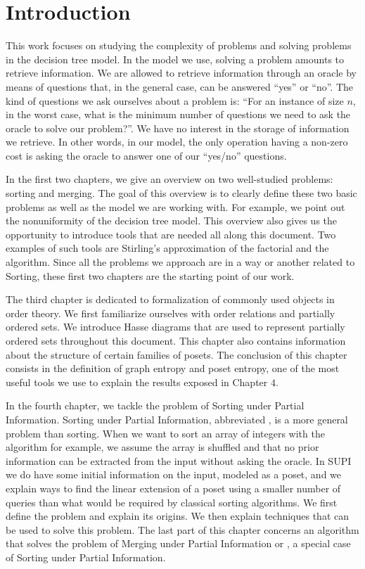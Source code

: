\chapter*{Introduction}
%

This work focuses on studying the complexity of problems and solving problems
in the decision tree model. In the model we use, solving a problem
amounts to retrieve information. We are allowed to retrieve information
through an oracle by means of questions that, in the general case,
can be answered ``yes'' or ``no''. The kind of questions we ask ourselves
about a problem is: ``For an instance of size \(n\), in the worst case, what is
the minimum number of questions we need to ask the oracle to solve our
problem?''. We have no interest in the storage of information we retrieve.
In other words, in our model, the only operation having a non-zero cost is
asking the oracle to answer one of our ``yes/no'' questions.

In the first two chapters, we give an overview on two well-studied problems:
sorting and merging. The goal of this overview is to clearly define these
two basic problems as well as the model we are working with. For example,
we point out the nonuniformity of the decision tree model. This overview
also gives us the opportunity to introduce tools that are needed all along
this document. Two examples of such tools are Stirling's approximation of the
factorial and the
\mergesort algorithm. Since all the problems we approach are in a way or
another related to Sorting, these first two chapters are the starting point of
our work.

The third chapter is dedicated to formalization of commonly used objects
in order theory. We first familiarize ourselves with order
relations and partially ordered sets. We introduce Hasse diagrams that
are used to represent partially ordered sets throughout this document.
This chapter also contains information about the structure of
certain families of posets. The conclusion of this
chapter consists in the definition of graph entropy and
poset entropy, one of the most useful tools we use to explain the
results exposed in Chapter \(4\).

In the fourth chapter, we tackle the problem of Sorting under Partial
Information. Sorting under Partial Information, abbreviated , is
a more general problem than sorting. When we want to sort an array of integers
with the \quicksort algorithm for example, we assume the array is shuffled and
that no prior information can be extracted from the input without asking the
oracle. In SUPI we do have some initial information on the input, modeled as a
poset, and we explain ways
to find the linear extension of a poset using a smaller number of queries than
what would be required by classical sorting algorithms. We first define
the problem and explain its origins. We then explain techniques that can
be used to solve this problem. The last part of this chapter concerns an
algorithm that solves the problem of Merging under Partial Information or
, a special case of Sorting under Partial Information.

